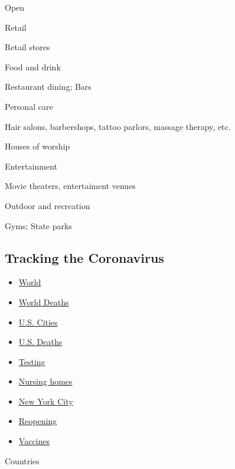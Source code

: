 Open

Retail

Retail stores

Food and drink

Restaurant dining; Bars

Personal care

Hair salons, barbershops, tattoo parlors, massage therapy, etc.

Houses of worship

Entertainment

Movie theaters, entertaiment venues

Outdoor and recreation

Gyms; State parks

\hypertarget{tracking-the-coronavirus}{%
\subsection{Tracking the Coronavirus}\label{tracking-the-coronavirus}}

\begin{itemize}
\tightlist
\item
  \href{https://www.nytimes.com/interactive/2020/world/coronavirus-maps.html}{World}
\item
  \href{https://www.nytimes.com/interactive/2020/04/21/world/coronavirus-missing-deaths.html}{World
  Deaths}
\item
  \href{https://www.nytimes.com/interactive/2020/04/23/upshot/five-ways-to-monitor-coronavirus-outbreak-us.html}{U.S.
  Cities}
\item
  \href{https://www.nytimes.com/interactive/2020/05/05/us/coronavirus-death-toll-us.html}{U.S.
  Deaths}
\item
  \href{https://www.nytimes.com/interactive/2020/us/coronavirus-testing.html}{Testing}
\item
  \href{https://www.nytimes.com/interactive/2020/us/coronavirus-nursing-homes.html}{Nursing
  homes}
\item
  \href{https://www.nytimes.com/interactive/2020/nyregion/new-york-city-coronavirus-cases.html}{New
  York City}
\item
  \href{https://www.nytimes.com/interactive/2020/us/states-reopen-map-coronavirus.html}{Reopening}
\item
  \href{https://www.nytimes.com/interactive/2020/science/coronavirus-vaccine-tracker.html}{Vaccines}
\end{itemize}

Countries

